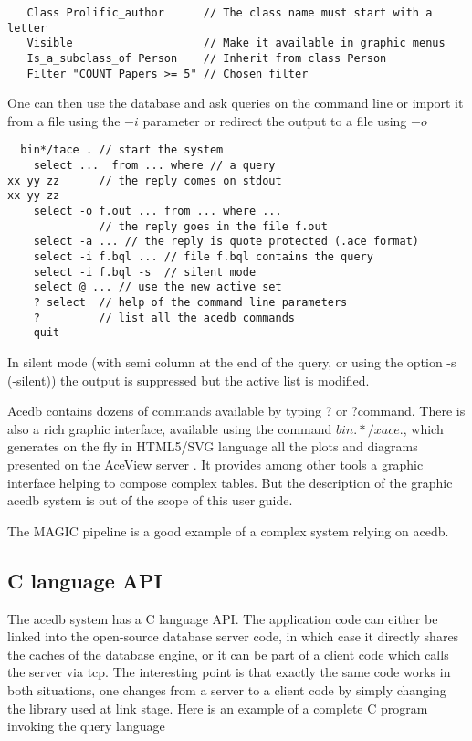 \documentclass[11pt]{article}
\newcommand{\BL}{\begin{lstlisting}}
\begin{document}
\BL
   Class Prolific_author      // The class name must start with a letter
   Visible                    // Make it available in graphic menus
   Is_a_subclass_of Person    // Inherit from class Person
   Filter "COUNT Papers >= 5" // Chosen filter
\end{lstlisting}

One can then use the database and ask queries on the command
line or import it from a file using the $-$$i$ parameter
or redirect the output to a file using $-$$o$
\BL
  bin*/tace . // start the system
    select ...  from ... where // a query
xx yy zz      // the reply comes on stdout
xx yy zz
    select -o f.out ... from ... where ...
              // the reply goes in the file f.out
    select -a ... // the reply is quote protected (.ace format)
    select -i f.bql ... // file f.bql contains the query
    select -i f.bql -s  // silent mode
    select @ ... // use the new active set 
    ? select  // help of the command line parameters
    ?         // list all the acedb commands
    quit
\end{lstlisting}
In silent mode (with semi column at the end of the query, or using
the option -s (-silent)) the output is suppressed but the
active list is modified.

Acedb contains dozens of commands available by typing ? or ?command.
There is also a rich graphic interface, available using the
command $bin.*/xace .$, which generates on the fly in HTML5/SVG language
all the plots and diagrams presented on the AceView server \cite{cDNA}.
It provides among other tools
a graphic interface helping to compose complex tables.
But the description of the graphic acedb system is out of the scope of this 
user guide.

The MAGIC pipeline  \cite{DJTM} is a good example of a complex system 
relying on acedb.



\subsection{C language API}

The acedb system has a C language API. The application code
can either be linked into the open-source database server code,
in which case it directly shares the caches of the database engine,
or it can be part of a client code which calls the server
via tcp. The interesting point is that exactly the same code
works in both situations, one changes from a server to a client
code by simply changing the library used at link stage.
Here is an example of a complete C program invoking the query language  
\end{document}
